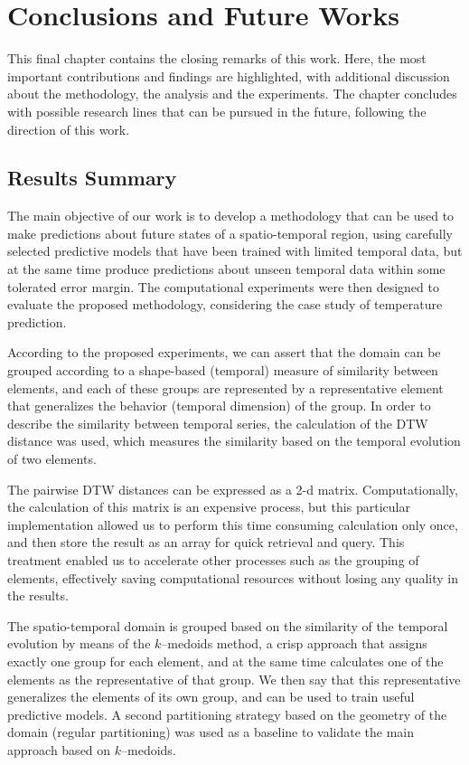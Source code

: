 \chapter{Conclusions and Future Works}
\label{chapter_Conclusions}

This final chapter contains the closing remarks of this work. Here, the most important contributions and findings are highlighted, with additional discussion about the methodology, the analysis and the experiments. The chapter concludes with possible research lines that can be pursued in the future, following the direction of this work.
	
\section{Results Summary}
\label{Sec:ResultsSummary}

The main objective of our work is to develop a methodology that can be used to make predictions about future states of a spatio-temporal region, using carefully selected predictive models that have been trained with limited temporal data, but at the same time produce predictions about unseen temporal data within some tolerated error margin. The computational experiments were then designed to evaluate the proposed methodology, considering the case study of temperature prediction.

According to the proposed experiments, we can assert that the domain can be grouped according to a shape-based (temporal) measure of similarity between elements, and each of these groups are represented by a representative element that generalizes the behavior (temporal dimension) of the group. In order to describe the similarity between temporal series, the calculation of the DTW distance was used, which measures the similarity based on the temporal evolution of two elements.

The pairwise DTW distances can be expressed as a 2-d matrix. Computationally, the calculation of this matrix is an expensive process, but this particular implementation allowed us to perform this time consuming calculation only once, and then store the result as an array for quick retrieval and query. This treatment enabled us to accelerate other processes such as the grouping of elements, effectively saving computational resources without losing any quality in the results.

The spatio-temporal domain is grouped based on the similarity of the temporal evolution by means of the $k$--medoids method, a crisp approach that assigns exactly one group for each element, and at the same time calculates one of the elements as the representative of that group. We then say that this representative generalizes the elements of its own group, and can be used to train useful predictive models. A second partitioning strategy based on the geometry of the domain (regular partitioning) was used as a baseline to validate the main approach based on $k$--medoids. %

